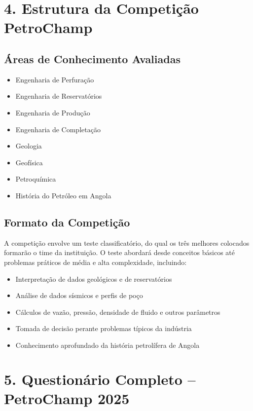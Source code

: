 \documentclass[11pt,a4paper]{article}
\begin{document}
\section*{4. Estrutura da Competição PetroChamp}

\subsection*{Áreas de Conhecimento Avaliadas}

\begin{itemize}
  \item Engenharia de Perfuração
  \item Engenharia de Reservatórios
  \item Engenharia de Produção
  \item Engenharia de Completação
  \item Geologia
  \item Geofísica
  \item Petroquímica
  \item História do Petróleo em Angola
\end{itemize}

\subsection*{Formato da Competição}

A competição envolve um teste classificatório, do qual os três melhores colocados formarão o time da instituição. O teste abordará desde conceitos básicos até problemas práticos de média e alta complexidade, incluindo:

\begin{itemize}
  \item Interpretação de dados geológicos e de reservatórios
  \item Análise de dados sísmicos e perfis de poço
  \item Cálculos de vazão, pressão, densidade de fluido e outros parâmetros
  \item Tomada de decisão perante problemas típicos da indústria
  \item Conhecimento aprofundado da história petrolífera de Angola
\end{itemize}

\newpage

\section*{5. Questionário Completo – PetroChamp 2025}
\end{document}
